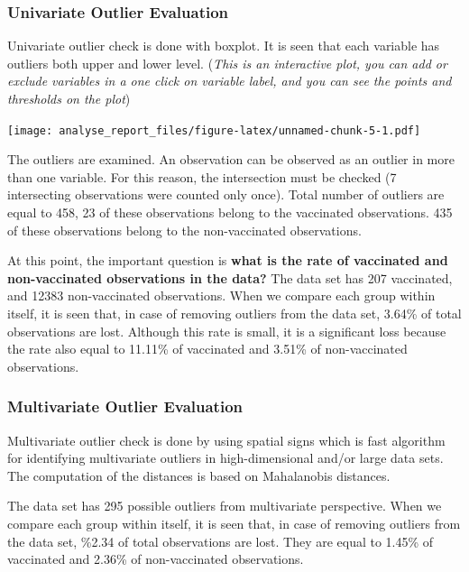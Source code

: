 \documentclass[
]{article}
\begin{document}
\hypertarget{univariate-outlier-evaluation}{%
\subsubsection{Univariate Outlier
Evaluation}\label{univariate-outlier-evaluation}}

Univariate outlier check is done with boxplot. It is seen that each
variable has outliers both upper and lower level. (\emph{This is an
interactive plot, you can add or exclude variables in a one click on
variable label, and you can see the points and thresholds on the plot})

\texttt{[image: analyse\_report\_files/figure-latex/unnamed-chunk-5-1.pdf]}

The outliers are examined. An observation can be observed as an outlier
in more than one variable. For this reason, the intersection must be
checked (7 intersecting observations were counted only once). Total
number of outliers are equal to 458, 23 of these observations belong to
the vaccinated observations. 435 of these observations belong to the
non-vaccinated observations.

At this point, the important question is \textbf{what is the rate of
vaccinated and non-vaccinated observations in the data?} The data set
has 207 vaccinated, and 12383 non-vaccinated observations. When we
compare each group within itself, it is seen that, in case of removing
outliers from the data set, 3.64\% of total observations are lost.
Although this rate is small, it is a significant loss because the rate
also equal to 11.11\% of vaccinated and 3.51\% of non-vaccinated
observations.

\hypertarget{multivariate-outlier-evaluation}{%
\subsubsection{Multivariate Outlier
Evaluation}\label{multivariate-outlier-evaluation}}

Multivariate outlier check is done by using spatial signs which is fast
algorithm for identifying multivariate outliers in high-dimensional
and/or large data sets. The computation of the distances is based on
Mahalanobis distances.

The data set has 295 possible outliers from multivariate perspective.
When we compare each group within itself, it is seen that, in case of
removing outliers from the data set, \%2.34 of total observations are
lost. They are equal to 1.45\% of vaccinated and 2.36\% of
non-vaccinated observations.
\end{document}
